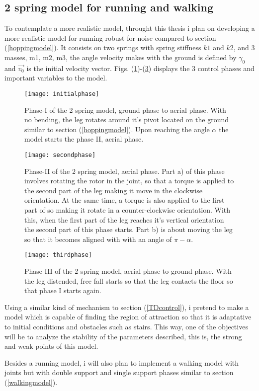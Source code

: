 \subsection{2 spring model for running and walking}\label{2springssection}
To contemplate a more realistic model, throught this thesis i plan on developing a more realistic model for running robust for noise compared to section (\ref{hoppingmodel}). It consists on two springs with spring stiffness $k1$ and $k2$, and 3 masses, m1, m2, m3, the angle velocity makes with the ground is defined by $\gamma_0$ and $\vec{v_0}$ is the initial velocity vector. Figs. (\ref{2spring1})-(\ref{2spring3}) displays the 3 control phases and important variables to the model. 

\begin{figure}[H]
   \centering
   \texttt{[image: initialphase]}
   \caption{Phase-I of the 2 spring model, ground phase to aerial phase. With no bending, the leg rotates around it's pivot located on the ground similar to section (\ref{hoppingmodel}). Upon reaching the angle $\alpha$ the model starts the phase II, aerial phase.}
   \label{2spring1}
  \end{figure}

\begin{figure}[H]
  \centering
  \texttt{[image: secondphase]}
  \caption{Phase-II of the 2 spring model, aerial phase. Part a) of this phase involves rotating the rotor in the joint, so that a torque is applied to the second part of the leg making it move in the clockwise orientation. At the same time, a torque is also applied to the first part of so making it rotate in a counter-clockwise orientation. With this, when the first part of the leg reaches it's vertical orientation the second part of this phase starts. Part b) is about moving the leg so that it becomes aligned with with an angle of $\pi-\alpha$. }
  \label{2spring2}
\end{figure}

\begin{figure}[H]
  \centering
  \texttt{[image: thirdphase]}
  \caption{Phase III of the 2 spring model, aerial phase to ground phase. With the leg distended, free fall starts so that the leg contacts the floor so that phase I starts again.}
     \label{2spring3}
  \end{figure}

Using a similar kind of mechanism to section (\ref{TDcontrol}), i pretend to make a model  which is capable of finding the region of attraction so that it is adaptative to initial conditions and obstacles such as stairs. This way, one of the objectives will be to analyze the stability of the parameters described, this is, the strong and weak points of this model.

Besides a running model, i will also plan to implement a walking model with joints but with double support and single support phases similar to section (\ref{walkingmodel}). 
